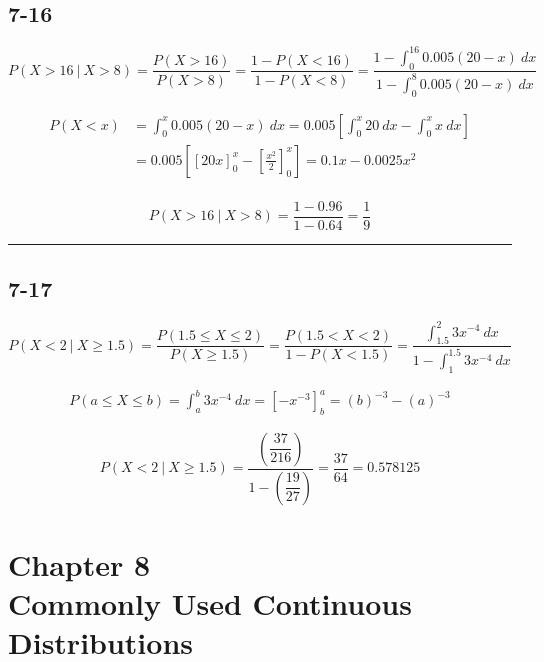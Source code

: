 \documentclass{article}
\newcommand{\qline}{\par\noindent\rule{4.5in}{1pt}}
\begin{document}
		\subsection*{7-16}

			\[
				P(X > 16 \ | \ X > 8) = \frac{P(X > 16)}{P(X > 8)} = \frac{1 - P(X < 16)}{1 - P(X < 8)} = \frac{1 - \int_{0}^{16} 0.005(20 - x) \ dx}{1 - \int_{0}^{8} 0.005(20 - x) \ dx}
			\]

			\begin{equation*}
				\begin{split}
					P(X < x) &= \int_{0}^{x} 0.005(20 - x) \ dx = 0.005 \left[ \int_{0}^{x} 20 \ dx - \int_{0}^{x} x \ dx \right] \\
					&= 0.005 \left[ \left[ 20x \right]^x_0 - \left[ \frac{x^2}{2} \right]^x_0 \right] = 0.1x - 0.0025x^2 \\
				\end{split}
			\end{equation*}

			\[
				P(X > 16 \ | \ X > 8) = \frac{1 - 0.96}{1 - 0.64} = \boxed{\frac{1}{9}}
			\]

	\qline

		\subsection*{7-17}

			\[
				P(X < 2 \ | \ X \geq 1.5) = \frac{P(1.5 \leq X \leq 2)}{P(X \geq 1.5)} = \frac{P(1.5 < X < 2)}{1 - P(X < 1.5)} = \frac{\int_{1.5}^{2} 3x^{-4} \ dx}{1 - \int_{1}^{1.5} 3x^{-4} \ dx}
			\]

			\begin{equation*}
				\begin{split}
					P(a \leq X \leq b) = \int_{a}^{b} 3x^{-4} \ dx = \left[ -x^{-3} \right]^a_b = (b)^{-3} - (a)^{-3}
				\end{split}
			\end{equation*}

			\[
				P(X < 2 \ | \ X \geq 1.5) = \frac{\left( \dfrac{37}{216} \right)}{1 - \left( \dfrac{19}{27} \right)} = \frac{37}{64} = \boxed{0.578125}
			\]

	\clearpage

	\section[Chapter 8: Commonly Used Continuous Distributions]{Chapter 8 \\
		Commonly Used Continuous Distributions}
\end{document}
